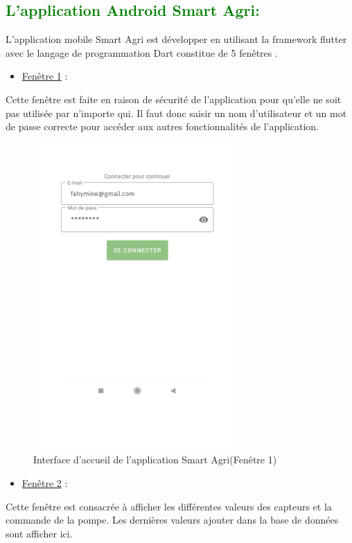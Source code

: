 \begin{flushleft}
	\subsection{\textcolor{green}{L’application Android Smart Agri:}}
	L’application mobile Smart Agri est développer en utilisant la framework flutter avec le langage de programmation Dart constitue de 5 fenêtres .
	\begin{itemize}
		\item \underline{Fenêtre 1} :
	\end{itemize}
	Cette fenêtre est faite en raison de sécurité de l’application pour qu’elle ne soit pas utilisée par n’importe qui. Il faut donc saisir un nom d’utilisateur et un mot  de passe correcte pour accéder aux autres fonctionnalités de l’application.
	\begin{figure}[h]
		\centering
		\includegraphics{chapitres/images/fenetre1.PNG}
		\caption{Interface d'accueil de l'application Smart Agri(Fenêtre 1)}
		\label{fig:labelname}
	\end{figure}
	\newpage
	\begin{itemize}
		\item \underline{Fenêtre 2} :
	\end{itemize} 
	Cette fenêtre est consacrée à afficher les différentes valeurs des capteurs et la commande de la  pompe. 
	Les dernières valeurs ajouter dans la base de données sont afficher ici.
	\newpage 
	\begin{figure}[h]
		\centering

\end{figure}
\end{flushleft}
